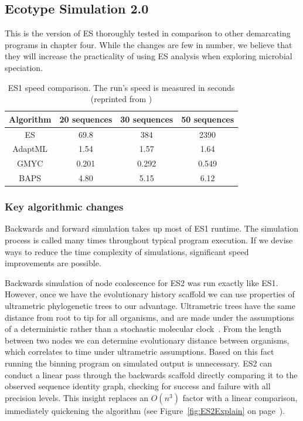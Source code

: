 \subsection*{Ecotype Simulation 2.0}
This is the version of ES thoroughly tested in comparison to other demarcating programs in chapter four.
While the changes are few in number, we believe that they will increase the practicality of using ES analysis when exploring microbial speciation.

\begin{table}
 \begin{tabular}{| c | c | c | c |}
  \hline
  Algorithm & 20 sequences & 30 sequences & 50 sequences \\ \hline
  ES & 69.8 & 384 & 2390 \\
  AdaptML & 1.54 & 1.57 & 1.64 \\
  GMYC & 0.201 & 0.292 & 0.549 \\
  BAPS & 4.80 & 5.15 & 6.12 \\
  \hline
 \end{tabular}
 \caption[ES1 runtime compared to other demarcation programs.]{ES1 speed comparison. The run's speed is measured in seconds (reprinted from \protect\cite{carlo})}
 \label{tab:ES1speed}
\end{table}

\subsubsection*{Key algorithmic changes}
Backwards and forward simulation takes up most of ES1 runtime.
The simulation process is called many times throughout typical program execution.
If we devise ways to reduce the time complexity of simulations, significant speed improvements are possible.

Backwards simulation of node coalescence for ES2 was run exactly like ES1.
However, once we have the evolutionary history scaffold we can use properties of ultrametric phylogenetic trees to our advantage.
Ultrametric trees have the same distance from root to tip for all organisms, and are made under the assumptions of a deterministic rather than a stochastic molecular clock~\cite{ho2008molecular}.
From the length between two nodes we can determine evolutionary distance between organisms, which correlates to time under ultrametric assumptions.
Based on this fact running the binning program on simulated output is unnecessary.
ES2 can conduct a linear pass through the backwards scaffold directly comparing it to the observed sequence identity graph, checking for success and failure with all precision levels.
This insight replaces an $O(n^3)$ factor with a linear comparison, immediately quickening the algorithm (see Figure~\ref{fig:ES2Explain} on page~\pageref{fig:ES2Explain}).

